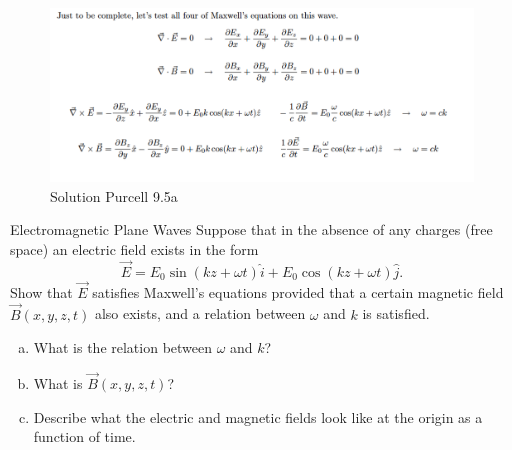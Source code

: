 \documentclass[makesolutionspdf]{esg8022pset}
\begin{document}
\begin{solution}
  \begin{figure}[H]
    \centering
    \includegraphics[width = 15cm]{solpu905a}
    \caption{Solution Purcell 9.5a}
  \end{figure}
\end{solution}


\begin{problem}{Electromagnetic Plane Waves}
  Suppose that in the absence of any charges (free
  space) an electric field exists in the form
  $$\vec E = E_0\sin(kz + \omega t) \hat i + E_0 \cos(kz + \omega t) \hat j.$$
  Show that $\vec E$ satisfies Maxwell's equations provided that a certain magnetic field $\vec B(x,y,z,t)$
  also exists, and a relation between $\omega$ and $k$ is satisfied.
  \begin{enumerate}[(a)]
    \item What is the relation between $\omega$ and $k$?
    \item What is $\vec B(x,y,z,t)$?
    \item Describe what the electric and magnetic fields look like at the origin as a function of
    time.
  \end{enumerate}
\end{problem}
\end{document}
